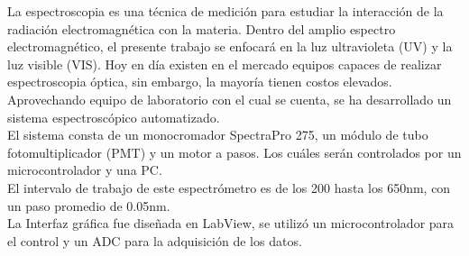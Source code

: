\tableofcontents
\listoffigures
\listoftables
{}
La espectroscopia es una técnica de medición para estudiar la interacción de la radiación electromagnética con la materia.
Dentro del amplio espectro electromagnético, el presente trabajo se enfocará en la luz ultravioleta (UV) y la luz visible (VIS). Hoy en día existen en el mercado equipos capaces de realizar espectroscopia óptica, sin embargo, la mayoría tienen costos elevados. Aprovechando equipo de laboratorio con el cual se cuenta, se ha desarrollado un sistema espectroscópico automatizado. \\
El sistema consta de un monocromador SpectraPro 275, un módulo de tubo fotomultiplicador (PMT) y un motor a pasos. Los cuáles serán controlados por un microcontrolador y una PC.\\
El intervalo de trabajo de este espectrómetro es de los 200 hasta los 650nm, con un paso promedio de 0.05nm. \\
La Interfaz gráfica fue diseñada en LabView, se utilizó un microcontrolador para el control y un ADC para la adquisición de los datos.
